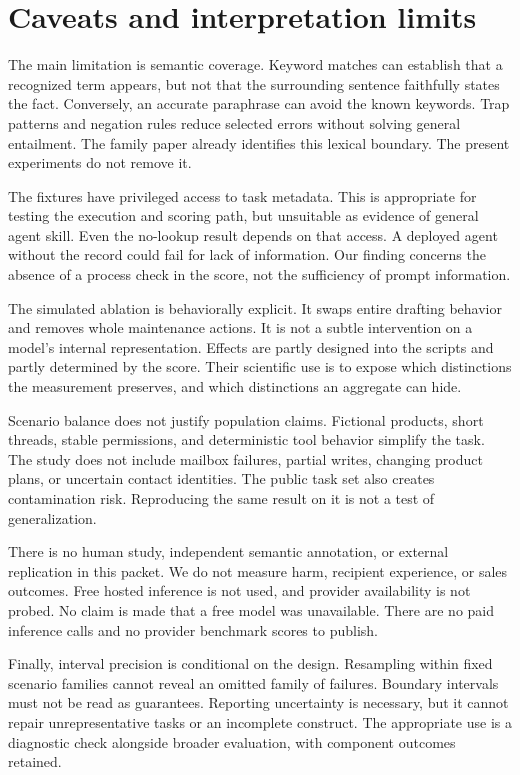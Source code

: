 \documentclass{article}
\begin{document}
\section{Caveats and interpretation limits}
The main limitation is semantic coverage. Keyword matches can establish that a recognized term appears, but not that the surrounding sentence faithfully states the fact. Conversely, an accurate paraphrase can avoid the known keywords. Trap patterns and negation rules reduce selected errors without solving general entailment. The family paper already identifies this lexical boundary. The present experiments do not remove it.\par
The fixtures have privileged access to task metadata. This is appropriate for testing the execution and scoring path, but unsuitable as evidence of general agent skill. Even the no-lookup result depends on that access. A deployed agent without the record could fail for lack of information. Our finding concerns the absence of a process check in the score, not the sufficiency of prompt information.\par
The simulated ablation is behaviorally explicit. It swaps entire drafting behavior and removes whole maintenance actions. It is not a subtle intervention on a model's internal representation. Effects are partly designed into the scripts and partly determined by the score. Their scientific use is to expose which distinctions the measurement preserves, and which distinctions an aggregate can hide.\par
Scenario balance does not justify population claims. Fictional products, short threads, stable permissions, and deterministic tool behavior simplify the task. The study does not include mailbox failures, partial writes, changing product plans, or uncertain contact identities. The public task set also creates contamination risk. Reproducing the same result on it is not a test of generalization.\par
There is no human study, independent semantic annotation, or external replication in this packet. We do not measure harm, recipient experience, or sales outcomes. Free hosted inference is not used, and provider availability is not probed. No claim is made that a free model was unavailable. There are no paid inference calls and no provider benchmark scores to publish.\par
Finally, interval precision is conditional on the design. Resampling within fixed scenario families cannot reveal an omitted family of failures. Boundary intervals must not be read as guarantees. Reporting uncertainty is necessary, but it cannot repair unrepresentative tasks or an incomplete construct. The appropriate use is a diagnostic check alongside broader evaluation, with component outcomes retained.\par
\end{document}
